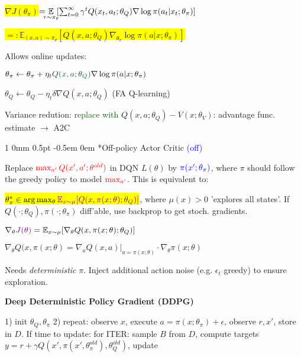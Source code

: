 \documentclass[11pt,landscape,a4paper,fleqn]{article}
\makeatletter
\newcommand*{\rsection}{%
	\@startsection{section}%
	{1}%
	{0mm}%
	{0.5pt}%
	{-0.5em \@plus 0em}
	{\color{myorange}\sffamily\small\bfseries}}
\newcommand{\mhl}[1]{\setlength{\fboxsep}{0pt}\colorbox{yellow}{#1}}
\makeatother
\begin{document}
\begin{multicols*}{4}
\mhl{$\nabla J(\theta_\pi)$}$= \hspace*{-2mm} \underset{\tau \sim \pi_\theta}{\mathbb{E}} \hspace*{-1mm} [\sum_{t=0}^\infty \gamma^t Q(x_t, a_t; \theta_Q) \nabla \log \pi(a_t | x_t; \theta_\pi)]$


\mhl{$ =: \mathbb{E}_{(x,a) \sim \pi_\theta} [Q(x,a;\theta_Q) \nabla_{\theta_\pi} \log \pi(a | x; \theta_\pi)]$}

Allows online updates:

$\theta_\pi \leftarrow \theta_\pi + \eta_t \textcolor{darkgreen}{Q(x,a;\theta_Q)} \nabla \log \pi(a | x; \theta_\pi)$

$\theta_Q \leftarrow \theta_Q  - \eta_t \delta \nabla Q(x,a;\theta_Q)$ (FA Q-learning)

Variance redution: \textcolor{darkgreen}{replace with} $Q(x,a;\theta_Q) - V(x; \theta_V)$: advantage func. estimate $\rightarrow$ A2C

\rsection*{Off-policy Actor Critic} \textcolor{blue}{(off)}

Replace $\textcolor{red}{\max_{a'} Q(x', a'; \theta^{old})}$ in DQN $L(\theta)$ by $\textcolor{blue}{\pi(x'; \theta_\pi)}$, where $\pi$ should follow the greedy policy to model $\textcolor{red}{\max_{a'}}$. This is equivalent to:

\mhl{$\theta_\pi^* \in \arg\max_\theta \textcolor{violet}{\mathbb{E}_{x \sim \mu} [Q(x,\pi(x;\theta); \theta_Q)]}$},
where $\mu(x) > 0$ 'explores all states'. If $Q(\cdot; \theta_Q), \pi(\cdot; \theta_\pi)$ diff'able, use backprop to get stoch. gradients.

$\nabla_\theta \textcolor{violet}{J(\theta)} = \mathbb{E}_{x \sim \mu} [\nabla_\theta Q(x,\pi(x;\theta); \theta_Q)]$

$\nabla_{\theta} Q(x,\pi(x;\theta) = \nabla_a Q(x,a)|_{a = \pi(x;\theta)} \cdot \nabla_{\theta} \pi(x; \theta)$

Needs \textit{deterministic} $\pi$. Inject additional action noise (e.g. $\epsilon_t$ greedy) to ensure exploration.

{\fontsize{9.5}{6}\selectfont \textbf{Deep Deterministic Policy Gradient (DDPG)}}

1) init $\theta_Q, \theta_\pi$ 2) repeat: observe $x$, execute $a = \pi(x; \theta_\pi) + \epsilon$, observe $r,x'$, store in $D$. If time to update: for ITER: sample $B$ from $D$, compute targets
$y = r+ \gamma Q(x', \pi(x', \theta_\pi^{old}), \theta_Q^{old})$, update
\iffalse
do GD ($\theta_Q$)/ GA ($\theta_\pi$), update $\theta^{old} \leftarrow (1 - \rho) \theta^{old} + \rho \theta$
\fi


\end{multicols*}
\end{document}
